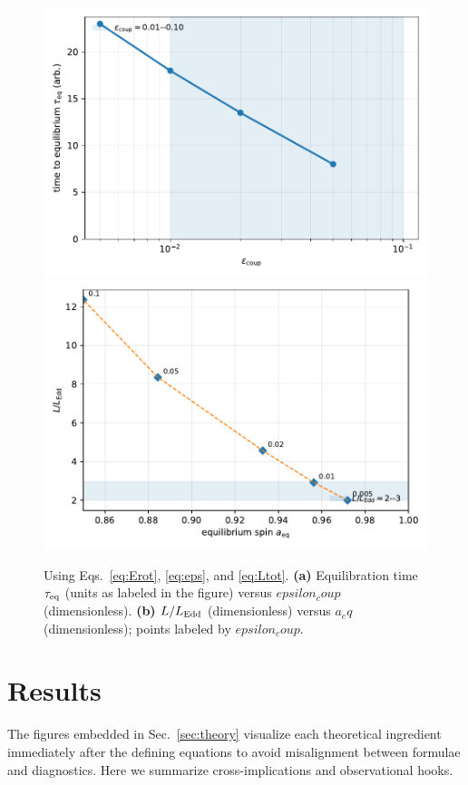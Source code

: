 \documentclass[twocolumn]{aastex701}
\newcommand{\LEdd}{L_{\rm Edd}}
\newcommand{\epscoup}{\epsilon_{\rm coup}}
\newcommand{\aeq}{a_{\rm eq}}
\def\epscoup{epsilon_coup}\def\aeq{a_eq}\def\mathrm#1{#1}%
\begin{document}
\begin{figure}[!htbp]
  \vspace*{2pt}
  \centering
  \includegraphics[width=.95\linewidth]{Fig4a.pdf}\\[4pt]
  \includegraphics[width=.95\linewidth]{Fig4b.pdf}
  \caption{Using Eqs.~\eqref{eq:Erot}, \eqref{eq:eps}, and \eqref{eq:Ltot}. \textbf{(a)} Equilibration time $\tau_{\rm eq}$ (units as labeled in the figure) versus $\epscoup$ (dimensionless). \textbf{(b)} $L/\LEdd$ (dimensionless) versus $\aeq$ (dimensionless); points labeled by $\epscoup$.}
  \label{fig:fig4}
\end{figure}

\section{Results}\label{sec:results}
The figures embedded in Sec.~\ref{sec:theory} visualize each theoretical ingredient immediately after the defining equations to avoid misalignment between formulae and diagnostics. Here we summarize cross-implications and observational hooks.
\end{document}
